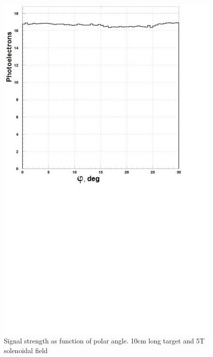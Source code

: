 \begin{figure}[!h]
    \centering
    \includegraphics[width=1.0\linewidth,trim={0.0cm 9.4cm 0.0cm 0.0cm},clip]{images/10cm_Targ_5T_Field_Phi.jpg}
    \caption{Signal strength as function of polar angle. 10cm long target and 5T solenoidal field}
    \label{fig:10cm_Targ_5T_Field_Phi}
\end{figure}

